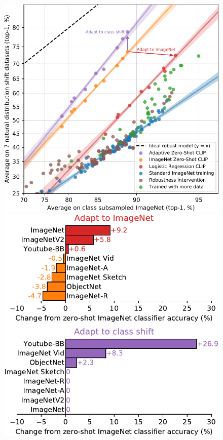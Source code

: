 \documentclass{article}
\begin{document}
\begin{figure}[t]
\begin{center}
\includegraphics[width=1.02\columnwidth]{robustness-interventions.pdf}
\includegraphics[width=0.98\columnwidth]{robustness-interventions-details.pdf}

\end{center}
\end{figure}
\end{document}
